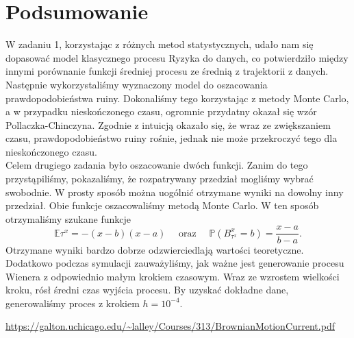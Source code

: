 \documentclass[12pt]{mwart}
\begin{document}
	\section{Podsumowanie}
	\noindent W zadaniu 1, korzystając z różnych metod statystycznych, udało nam się dopasować model klasycznego procesu Ryzyka do danych, co potwierdziło między innymi porównanie funkcji średniej procesu ze średnią z trajektorii z danych. Następnie wykorzystaliśmy wyznaczony model do oszacowania prawdopodobieństwa ruiny. Dokonaliśmy tego korzystając z metody Monte Carlo, a w przypadku nieskończonego czasu, ogromnie przydatny okazał się wzór Pollaczka-Chinczyna. Zgodnie z intuicją okazało się, że wraz ze zwiększaniem czasu, prawdopodobieństwo ruiny rośnie, jednak nie może przekroczyć tego dla nieskończonego czasu.\vspace{1.5mm}\\
	\noindent Celem drugiego zadania było oszacowanie dwóch funkcji.
	Zanim do tego przystąpiliśmy, pokazaliśmy, że rozpatrywany przedział mogliśmy wybrać swobodnie. W prosty sposób można uogólnić otrzymane wyniki na dowolny inny przedział. Obie funkcje oszacowaliśmy metodą Monte Carlo. W ten sposób otrzymaliśmy szukane funkcje
	\begin{equation*}
		\mathbb{E}\tau^x=-(x-b)(x-a)\quad\text{ oraz }\quad\mathbb{P}\left(B^x_{\tau^x}=b\right)=\frac{x-a}{b-a}.
	\end{equation*}
	Otrzymane wyniki bardzo dobrze odzwierciedlają wartości teoretyczne.\vspace{1.5mm}\\
	\noindent Dodatkowo podczas symulacji zauważyliśmy, jak ważne jest generowanie procesu Wienera z odpowiednio małym krokiem czasowym. Wraz ze wzrostem wielkości kroku, rósł średni czas wyjścia procesu. By uzyskać dokładne dane, generowaliśmy proces z krokiem $h=10^{-4}$.
	
	
	
	
	
	
	\newpage
	\begin{thebibliography}{1}
		\url{https://galton.uchicago.edu/~lalley/Courses/313/BrownianMotionCurrent.pdf}
	\end{thebibliography}
\end{document}
